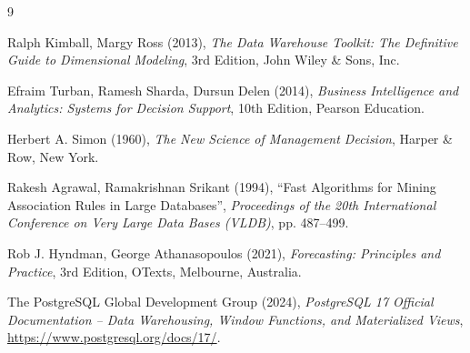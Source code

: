 \documentclass[a4paper, 12pt]{article}
\begin{document}
\begin{thebibliography}{9}

Ralph Kimball, Margy Ross (2013), \textit{The Data Warehouse Toolkit: The Definitive Guide to Dimensional Modeling}, 3rd Edition, John Wiley \& Sons, Inc.

Efraim Turban, Ramesh Sharda, Dursun Delen (2014), \textit{Business Intelligence and Analytics: Systems for Decision Support}, 10th Edition, Pearson Education.

Herbert A. Simon (1960), \textit{The New Science of Management Decision}, Harper \& Row, New York.

Rakesh Agrawal, Ramakrishnan Srikant (1994), ``Fast Algorithms for Mining Association Rules in Large Databases'', \textit{Proceedings of the 20th International Conference on Very Large Data Bases (VLDB)}, pp. 487--499.

Rob J. Hyndman, George Athanasopoulos (2021), \textit{Forecasting: Principles and Practice}, 3rd Edition, OTexts, Melbourne, Australia.

The PostgreSQL Global Development Group (2024), \textit{PostgreSQL 17 Official Documentation -- Data Warehousing, Window Functions, and Materialized Views}, \url{https://www.postgresql.org/docs/17/}.

\end{thebibliography}
\end{document}
